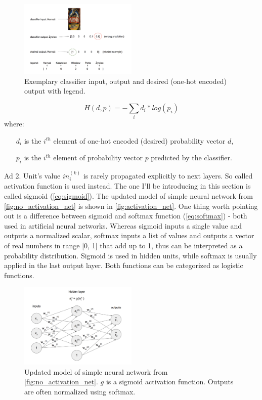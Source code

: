 \documentclass[11pt]{article}
\begin{document}
\begin{figure}[h]
\includegraphics[width=0.5\textwidth]{probability_vectors}
\centering
\caption{Exemplary classifier input, output and desired (one-hot encoded) output with legend.}
\label{fig:probability_vectors}
\end{figure}

\begin{equation} \label{eq:cross_entropy}
H(d, p) = -\sum_i d_i * log(p_i)
\end{equation}
where:
\begin{itemize}
\item[$d_i$] is the $i^{th}$ element of one-hot encoded (desired) probability vector $d$,
\item[$p_i$] is the $i^{th}$ element of probability vector $p$ predicted by the classifier.
\end{itemize}

Ad 2. Unit's value $in_i^{(k)}$ is rarely propagated explicitly to next layers. So called activation function is used instead. The one I'll be introducing in this section is called sigmoid (\autoref{eq:sigmoid}). The updated model of simple neural network from \autoref{fig:no_activation_net} is shown in \autoref{fig:activation_net}. One thing worth pointing out is a difference between sigmoid and softmax function (\autoref{eq:softmax}) - both used in artificial neural networks. Whereas sigmoid inputs a single value and outputs a normalized scalar, softmax inputs a list of values and outputs a vector of real numbers in range [0, 1] that add up to 1, thus can be interpreted as a probability distribution. Sigmoid is used in hidden units, while softmax is usually applied in the last output layer. Both functions can be categorized as logistic functions.\\

\begin{figure}[h]
\includegraphics[width=0.5\textwidth]{activation_net}
\centering
\caption{Updated model of simple neural network from \autoref{fig:no_activation_net}. $g$ is a sigmoid activation function. Outputs are often normalized using softmax.}
\label{fig:activation_net}
\end{figure}
\end{document}
